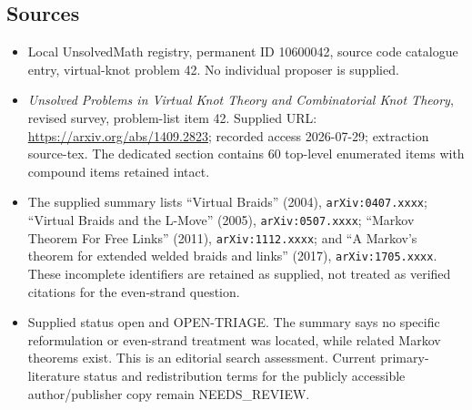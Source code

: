 \documentclass[11pt]{article}
\begin{document}
\subsection{Sources}
\begin{itemize}
\item Local UnsolvedMath registry, permanent ID 10600042, source code catalogue entry, virtual-knot problem 42. No individual proposer is supplied.
\item \emph{Unsolved Problems in Virtual Knot Theory and Combinatorial Knot Theory}, revised survey, problem-list item 42. Supplied URL: \url{https://arxiv.org/abs/1409.2823}; recorded access 2026-07-29; extraction source-tex. The dedicated section contains 60 top-level enumerated items with compound items retained intact.
\item The supplied summary lists ``Virtual Braids'' (2004), \texttt{arXiv:0407.xxxx}; ``Virtual Braids and the L-Move'' (2005), \texttt{arXiv:0507.xxxx}; ``Markov Theorem For Free Links'' (2011), \texttt{arXiv:1112.xxxx}; and ``A Markov's theorem for extended welded braids and links'' (2017), \texttt{arXiv:1705.xxxx}. These incomplete identifiers are retained as supplied, not treated as verified citations for the even-strand question.
\item Supplied status open and OPEN-TRIAGE. The summary says no specific reformulation or even-strand treatment was located, while related Markov theorems exist. This is an editorial search assessment. Current primary-literature status and redistribution terms for the publicly accessible author/publisher copy remain NEEDS\_REVIEW.
\end{itemize}
\end{document}
